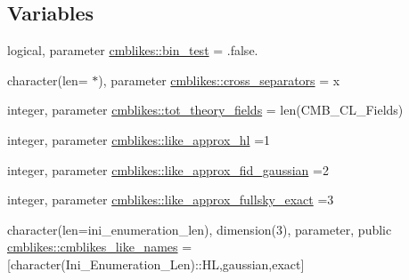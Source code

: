 \subsection*{Variables}
\begin{DoxyCompactItemize}
\item 
logical, parameter \mbox{\hyperlink{namespacecmblikes_a109d8823809382a8545c68b8598c8a06}{cmblikes\+::bin\+\_\+test}} = .false.
\item 
character(len= $\ast$), parameter \mbox{\hyperlink{namespacecmblikes_a55c986dc536bdd0894cd5bf2fb584f70}{cmblikes\+::cross\+\_\+separators}} = \textquotesingle{}x\textquotesingle{}
\item 
integer, parameter \mbox{\hyperlink{namespacecmblikes_a9a7a0c55bde53b41f76027a48c8eb811}{cmblikes\+::tot\+\_\+theory\+\_\+fields}} = len(C\+M\+B\+\_\+\+C\+L\+\_\+\+Fields)
\item 
integer, parameter \mbox{\hyperlink{namespacecmblikes_a9177762dd30aeda08fb17357714b0157}{cmblikes\+::like\+\_\+approx\+\_\+hl}} =1
\item 
integer, parameter \mbox{\hyperlink{namespacecmblikes_abf83af8cd899e4118189181fe7290a44}{cmblikes\+::like\+\_\+approx\+\_\+fid\+\_\+gaussian}} =2
\item 
integer, parameter \mbox{\hyperlink{namespacecmblikes_ae1ff0c9c884675bf7a8de01c01e5b082}{cmblikes\+::like\+\_\+approx\+\_\+fullsky\+\_\+exact}} =3
\item 
character(len=ini\+\_\+enumeration\+\_\+len), dimension(3), parameter, public \mbox{\hyperlink{namespacecmblikes_abc590f6fd0bd85c7afe4fed208f61b3e}{cmblikes\+::cmblikes\+\_\+like\+\_\+names}} = \mbox{[}character(Ini\+\_\+\+Enumeration\+\_\+\+Len)\+::\textquotesingle{}HL\textquotesingle{},\textquotesingle{}gaussian\textquotesingle{},\textquotesingle{}exact\textquotesingle{}\mbox{]}
\end{DoxyCompactItemize}
